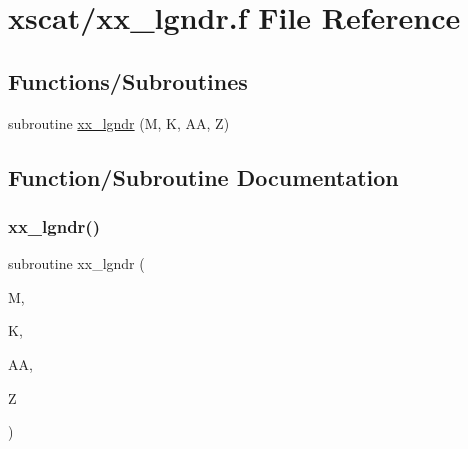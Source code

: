 \hypertarget{xx__lgndr_8f}{}\section{xscat/xx\+\_\+lgndr.f File Reference}
\label{xx__lgndr_8f}
\subsection*{Functions/\+Subroutines}
\begin{DoxyCompactItemize}
\item 
subroutine \hyperlink{xx__lgndr_8f_af2c225fdc2494c0e0a9cb0c76a8e81c9}{xx\+\_\+lgndr} (M, K, AA, Z)
\end{DoxyCompactItemize}


\subsection{Function/\+Subroutine Documentation}
\mbox{\label{xx__lgndr_8f_af2c225fdc2494c0e0a9cb0c76a8e81c9}} 
\subsubsection{\texorpdfstring{xx\+\_\+lgndr()}{xx\_lgndr()}}
{\footnotesize\ttfamily subroutine xx\+\_\+lgndr (\begin{DoxyParamCaption}\item[{}]{M,  }\item[{}]{K,  }\item[{}]{AA,  }\item[{}]{Z }\end{DoxyParamCaption})}

